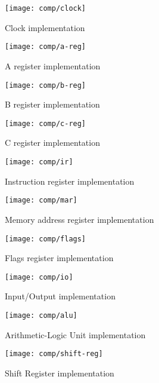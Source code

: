   \begin{figure}[h]
    \centering
    \texttt{[image: comp/clock]}
    \caption{Clock implementation}
    \label{clock-i}
  \end{figure}

  \begin{figure}[h]
    \centering
    \texttt{[image: comp/a-reg]}
    \caption{A register implementation}
    \label{a-reg-i}
  \end{figure}

  \begin{figure}[h]
    \centering
    \texttt{[image: comp/b-reg]}
    \caption{B register implementation}
    \label{b-reg-i}
  \end{figure}

  \begin{figure}[h]
    \centering
    \texttt{[image: comp/c-reg]}
    \caption{C register implementation}
    \label{c-reg-i}
  \end{figure}

  \begin{figure}[h]
    \centering
    \texttt{[image: comp/ir]}
    \caption{Instruction register implementation}
    \label{ir-i}
  \end{figure}

  \begin{figure}[h]
    \centering
    \texttt{[image: comp/mar]}
    \caption{Memory address register implementation}
    \label{mar-i}
  \end{figure}

  \begin{figure}[h]
    \centering
    \texttt{[image: comp/flags]}
    \caption{Flags register implementation}
    \label{flags-i}
  \end{figure}

  \begin{figure}[h]
    \centering
    \texttt{[image: comp/io]}
    \caption{Input/Output implementation}
    \label{io-i}
  \end{figure}

  \begin{figure}[h]
    \centering
    \texttt{[image: comp/alu]}
    \caption{Arithmetic-Logic Unit implementation}
    \label{alu-i}
  \end{figure}

  \begin{figure}[h]
    \centering
    \texttt{[image: comp/shift-reg]}
    \caption{Shift Register implementation}
    \label{shift-reg-i}
  \end{figure}

